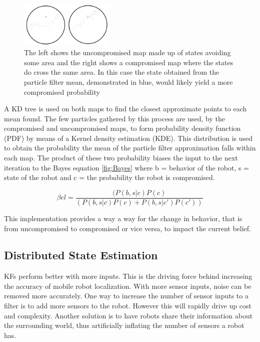 \documentclass[conference]{IEEEtran}
\begin{document}
\begin{figure}[]
\centering
\includegraphics[width=0.4\textwidth]{Path_comp_uncomp}
\caption{The left shows the uncompromised map made up of states avoiding some area and the right shows a compromised map where the states do cross the same area. In this case the state obtained from the particle filter mean, demonstrated in blue, would likely yield a more compromised probability}
\label{fig:compmaps}
\end{figure}
	
A KD tree is used on both maps to find the closest approximate points to each mean found. The few particles gathered by this process are used, by the compromised and uncompromised maps, to form probability density function (PDF) by means of a Kernel density estimation (KDE). This distribution is used to obtain the probability the mean of the particle filter approximation falls within each map. The product of these two probability biases the input to the next iteration to the Bayes equation \ref{fig:Bayes} where b = behavior of the robot, s = state of the robot and c = the probability the robot is compromised.

\begin{equation}
 \beta el =\frac {(P(b,s|c)P(c)} {(P(b,s|c)P(c) + 
 P(b,s|c' )P(c' ))} 
 \label{fig:Bayes}
\end{equation}

This implementation provides a way a way for the change in behavior, that is from uncompromised to compromised or vice versa, to impact the current belief.


\subsection{Distributed State Estimation}
KFs perform better with more inputs. This is the driving force behind increasing the accuracy of mobile robot localization. With more sensor inputs, noise can be removed more accurately. One way to increase the number of sensor inputs to a filter is to add more sensors to the robot. However this will rapidly drive up cost and complexity. Another solution is to have robots share their information about the surrounding world, thus artificially inflating the number of sensors a robot has.
\end{document}

